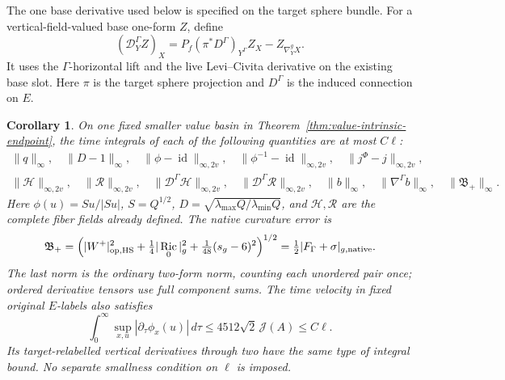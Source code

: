 \documentclass[11pt]{article}
\numberwithin{equation}{section}
\newtheorem{corollary}[theorem]{Corollary}
\theoremstyle{definition}
\theoremstyle{remark}
\DeclareMathOperator{\Ric}{Ric}
\newcommand{\id}{\operatorname{id}}
\begin{document}
The one base derivative used below is specified on the
target sphere bundle. For a vertical-field-valued base
one-form \(Z\), define
\[
 (\mathcal D_Y^\Gamma Z)_X
 =P_f(\pi^*D^\Gamma)_{Y^\Gamma}Z_X-Z_{\nabla^g_YX}.
\]
It uses the \(\Gamma\)-horizontal lift and the live
Levi--Civita derivative on the existing base slot.
Here \(\pi\) is the target sphere projection and
\(D^\Gamma\) is the induced connection on \(E\).

\begin{corollary}\label{cor:real-comparison-time}
On one fixed smaller value basin in
Theorem~\ref{thm:value-intrinsic-endpoint}, the time
integrals of each of the following quantities are at most
\(C\ell\):
\[
 \begin{gathered}
 \|q\|_\infty,\quad \|D-1\|_\infty,\quad
 \|\phi-\id\|_{\infty,2v},\quad \|\phi^{-1}-\id\|_{\infty,2v},
       \quad \|j^\Phi-j\|_{\infty,2v},\\
 \|\mathcal H\|_{\infty,2v},\quad\|\mathcal R\|_{\infty,2v},\quad
 \|\mathcal D^\Gamma\mathcal H\|_{\infty,2v},\quad
 \|\mathcal D^\Gamma\mathcal R\|_{\infty,2v},\quad
 \|b\|_\infty,\quad\|\nabla^\Gamma b\|_\infty,\quad
 \|\mathfrak B_+\|_\infty .
 \end{gathered}
\]
Here \(\phi(u)=Su/|Su|\), \(S=Q^{1/2}\),
\(D=\sqrt{\lambda_{\max}Q/\lambda_{\min}Q}\),
and \(\mathcal H,\mathcal R\) are the complete
fiber fields already defined. The native curvature error is
\begin{equation}\label{eq:native-positive-block}
 \mathfrak B_+
 =\left(|W^+|_{\rm op,HS}^2+\tfrac14|\Ric_0|_g^2
                   +\tfrac1{48}(s_g-6)^2\right)^{1/2}
 =\tfrac12|F_\Gamma+\sigma|_{g,\mathrm{native}} .
\end{equation}
The last norm is the ordinary two-form norm, counting
each unordered pair once; ordered derivative tensors
use full component sums. The time velocity in fixed
original \(E\)-labels also satisfies
\[
 \int_0^\infty\sup_{x,u}|\partial_\tau\phi_x(u)|\,d\tau
          \le4512\sqrt2\,\mathcal J(A)\le C\ell .
\]
Its target-relabelled vertical derivatives through two
have the same type of integral bound. No separate
smallness condition on \(\ell\) is imposed.
\end{corollary}
\end{document}
